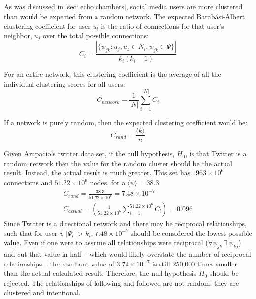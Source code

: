 \documentclass[preprint,review,12pt]{elsarticle}
\begin{document}
As was discussed in \ref{sec: echo chambers}, social media users are more clustered than would be expected from a random network. The expected Barab{\'a}si-Albert clustering coefficient for user $u_i$ is the ratio of connections for that user's neighbor, $u_j$ over the total possible connections:
\begin{equation}
    C_{i}=\frac{|\{\psi_{jk}: u_j,u_k \in N_i, \psi_{jk} \in \Psi\}|}{k_i(k_i -1)}
\end{equation}

For an entire network, this clustering coefficient is the average of all the individual clustering scores for all users:
\begin{equation}
    C_{network}=\frac{1}{|N|}\sum_{i=1}^{|N|}C_i
\end{equation}

If a network is purely random, then the expected clustering coefficient would be:
\begin{equation}
    C_{rand} = \frac{\langle k \rangle}{n}
\end{equation}

Given Arapacio's twitter data set, if the null hypothesis, $H_0$, is that Twitter is a random network then the value for the random cluster should be the actual result. Instead, the actual result is much greater. This set has $1963 \times 10^6$ connections and $51.22 \times 10^6$ nodes, for a $\langle \psi \rangle = 38.3$:
\begin{equation}
    \begin{split}
    C_{rand} = \frac{38.3}{51.22 \times 10^6} = 7.48 \times 10^{-7} \\
    C_{actual} =\left( \frac{1}{51.22 \times 10^6}\sum_{i=1}^{51.22 \times 10^6}C_i \right)= 0.096
    \end{split}
\end{equation}
Since Twitter is a directional network and there may be reciprocal relationships, such that for user \textit{i}, $|\Psi_i| > k_i$, $7.48 \times 10^{-7}$ should be considered the lowest possible value. Even if one were to assume all relationships were reciprocal ($\forall \psi_{jk}\  \exists \ \psi_{kj}$) and cut that value in half -- which would likely overstate the number of reciprocal relationships -- the resultant value of $3.74 \times 10^{-7}$ is still 250,000 times smaller than the actual calculated result. Therefore, the null hypothesis $H_0$ should be rejected. The relationships of following and followed are not random; they are clustered and intentional.
\end{document}
